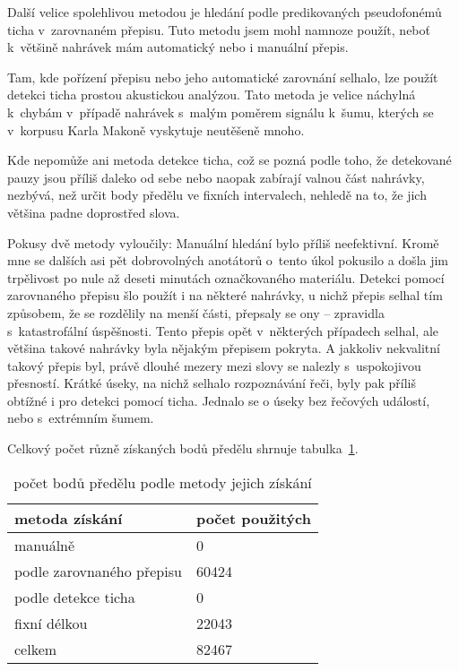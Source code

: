 Další velice spolehlivou metodou je hledání podle predikovaných pseudofonémů
ticha v~zarovnaném přepisu. Tuto metodu jsem mohl namnoze použít, neboť
k~většině nahrávek mám automatický nebo i manuální přepis.

Tam, kde pořízení přepisu nebo jeho automatické zarovnání selhalo, lze použít
detekci ticha prostou akustickou analýzou. Tato metoda je velice náchylná
k~chybám v~případě nahrávek s~malým poměrem signálu k~šumu, kterých se v~korpusu
Karla Makoně vyskytuje neutěšeně mnoho.

Kde nepomůže ani metoda detekce ticha, což se pozná podle toho, že detekované
pauzy jsou příliš daleko od sebe nebo naopak zabírají valnou část nahrávky,
nezbývá, než určit body předělu ve fixních intervalech, nehledě na to, že jich
většina padne doprostřed slova.

Pokusy dvě metody vyloučily: Manuální hledání bylo příliš neefektivní. Kromě mne
se dalších asi pět dobrovolných anotátorů o~tento úkol pokusilo a došla jim
trpělivost po nule až deseti minutách označkovaného materiálu. Detekci pomocí
zarovnaného přepisu šlo použít i na některé nahrávky, u nichž přepis selhal tím
způsobem, že se rozdělily na menší části, přepsaly se ony -- zpravidla
s~katastrofální úspěšnosti. Tento přepis opět v~některých případech selhal, ale
většina takové nahrávky byla nějakým přepisem pokryta. A jakkoliv nekvalitní
takový přepis byl, právě dlouhé mezery mezi slovy se nalezly s~uspokojivou
přesností. Krátké úseky, na nichž selhalo rozpoznávání řeči, byly pak příliš
obtížné i pro detekci pomocí ticha. Jednalo se o úseky bez řečových událostí,
nebo s~extrémním šumem.


Celkový počet různě získaných bodů předělu shrnuje
tabulka~\ref{tab:splitpoints}.

\begin{table}[htpb]
\begin{center}
\begin{tabular}{|l|l|}
\hline
metoda získání & počet použitých \\
\hline
manuálně & 0 \\
podle zarovnaného přepisu & 60424 \\
podle detekce ticha & 0 \\
fixní délkou & 22043 \\
celkem & 82467 \\
\hline
\end{tabular}
\caption{počet bodů předělu podle metody jejich získání}\label{tab:splitpoints}
\end{center}
\end{table}

